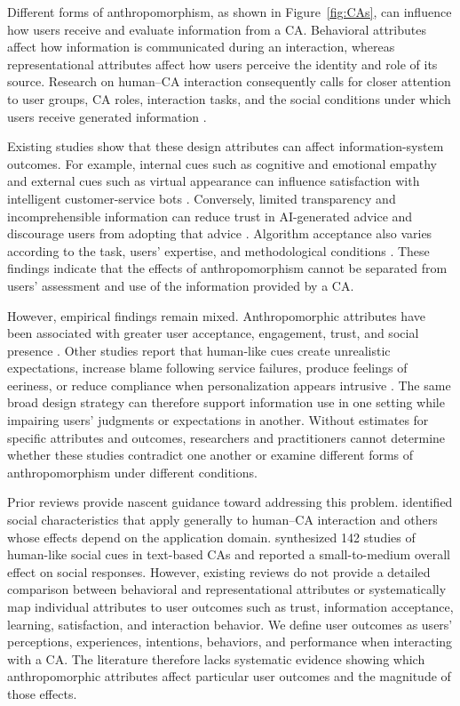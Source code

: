 \documentclass[preprint,review,12pt,authoryear,nonatbib]{elsarticle}
\begin{document}
Different forms of anthropomorphism, as shown in Figure~\ref{fig:CAs}, can influence how users receive and evaluate information from a CA. Behavioral attributes affect how information is communicated during an interaction, whereas representational attributes affect how users perceive the identity and role of its source. Research on human--CA interaction consequently calls for closer attention to user groups, CA roles, interaction tasks, and the social conditions under which users receive generated information \parencite{jiang_humanai_2024}.

Existing studies show that these design attributes can affect information-system outcomes. For example, internal cues such as cognitive and emotional empathy and external cues such as virtual appearance can influence satisfaction with intelligent customer-service bots \parencite{hu_joint_2023}. Conversely, limited transparency and incomprehensible information can reduce trust in AI-generated advice and discourage users from adopting that advice \parencite{zhu_not_2023}. Algorithm acceptance also varies according to the task, users' expertise, and methodological conditions \parencite{kaufmann_task_2023}. These findings indicate that the effects of anthropomorphism cannot be separated from users' assessment and use of the information provided by a CA.

However, empirical findings remain mixed. Anthropomorphic attributes have been associated with greater user acceptance, engagement, trust, and social presence \parencite{ashfaq2020deploying,blut2021understanding,gong_how_2008,konya2023anthropomorphism,raamkumar2022empathetic}. Other studies report that human-like cues create unrealistic expectations, increase blame following service failures, produce feelings of eeriness, or reduce compliance when personalization appears intrusive \parencite{ciechanowski2019shades,clavel2015sentiment,crolic2022blame,chen_you_2021}. The same broad design strategy can therefore support information use in one setting while impairing users' judgments or expectations in another. Without estimates for specific attributes and outcomes, researchers and practitioners cannot determine whether these studies contradict one another or examine different forms of anthropomorphism under different conditions.

Prior reviews provide nascent guidance toward addressing this problem. \textcite{chaves2021should} identified social characteristics that apply generally to human--CA interaction and others whose effects depend on the application domain. \textcite{klein_effects_2025} synthesized 142 studies of human-like social cues in text-based CAs and reported a small-to-medium overall effect on social responses. However, existing reviews do not provide a detailed comparison between behavioral and representational attributes or systematically map individual attributes to user outcomes such as trust, information acceptance, learning, satisfaction, and interaction behavior. We define user outcomes as users' perceptions, experiences, intentions, behaviors, and performance when interacting with a CA. The literature therefore lacks systematic evidence showing which anthropomorphic attributes affect particular user outcomes and the magnitude of those effects.
\end{document}
